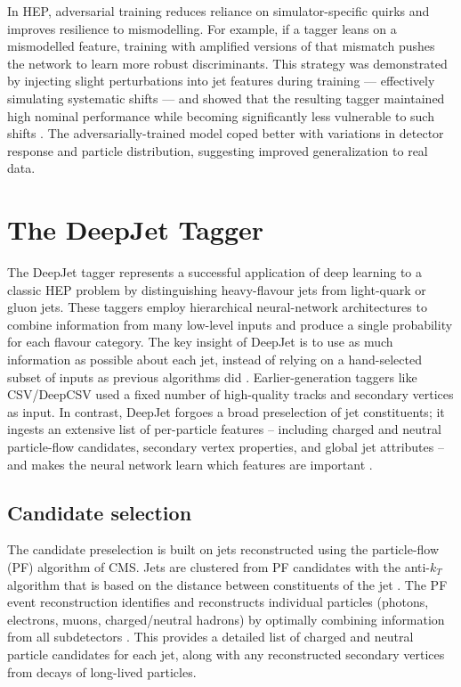 In HEP, adversarial training reduces reliance on simulator-specific quirks and improves resilience to mismodelling. For example, if a tagger leans on a mismodelled feature, training with amplified versions of that mismatch pushes the network to learn more robust discriminants. This strategy was demonstrated by injecting slight perturbations into jet features during training — effectively simulating systematic shifts — and showed that the resulting tagger maintained high nominal performance while becoming significantly less vulnerable to such shifts \cite{Stein2022}. The adversarially-trained model coped better with variations in detector response and particle distribution, suggesting improved generalization to real data.

\section{The DeepJet Tagger}
\label{sec:DeepJet}

The DeepJet tagger represents a successful application of deep learning to a classic HEP problem by distinguishing heavy-flavour jets from light-quark or gluon jets. These taggers employ hierarchical neural-network architectures to combine information from many low-level inputs and produce a single probability for each flavour category. The key insight of DeepJet is to use as much information as possible about each jet, instead of relying on a hand-selected subset of inputs as previous algorithms did \cite{Bols_2020}. Earlier-generation taggers like CSV/DeepCSV used a fixed number of high-quality tracks and secondary vertices as input. In contrast, DeepJet forgoes a broad preselection of jet constituents; it ingests an extensive list of per-particle features – including charged and neutral particle-flow candidates, secondary vertex properties, and global jet attributes – and makes the neural network learn which features are important \cite{Bols_2020}.

\subsection{Candidate selection}

The candidate preselection is built on jets reconstructed using the particle-flow (PF) algorithm of CMS. Jets are clustered from PF candidates with the anti-$k_T$ algorithm that is based on the distance between constituents of the jet \cite{Tumasyan_2022}. The PF event reconstruction identifies and reconstructs individual particles (photons, electrons, muons, charged/neutral hadrons) by optimally combining information from all subdetectors \cite{Tumasyan_2022}. This provides a detailed list of charged and neutral particle candidates for each jet, along with any reconstructed secondary vertices from decays of long-lived particles.

